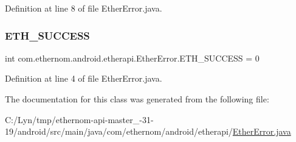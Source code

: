 Definition at line 8 of file Ether\+Error.\+java.

\mbox{\label{classcom_1_1ethernom_1_1android_1_1etherapi_1_1_ether_error_a9c92acbfd73c9c3ea282a84f500b2846}} 
\subsubsection{\texorpdfstring{E\+T\+H\+\_\+\+S\+U\+C\+C\+E\+SS}{ETH\_SUCCESS}}
{\footnotesize\ttfamily int com.\+ethernom.\+android.\+etherapi.\+Ether\+Error.\+E\+T\+H\+\_\+\+S\+U\+C\+C\+E\+SS = 0\hspace{0.3cm}{\ttfamily [static]}}



Definition at line 4 of file Ether\+Error.\+java.



The documentation for this class was generated from the following file\+:\begin{DoxyCompactItemize}
\item 
C\+:/\+Lyn/tmp/ethernom-\/api-\/master\+\_-\/31-\/19/android/src/main/java/com/ethernom/android/etherapi/\mbox{\hyperlink{_ether_error_8java}{Ether\+Error.\+java}}\end{DoxyCompactItemize}
